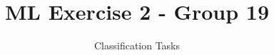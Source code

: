 \documentclass{sig-alternate-05-2015}
\begin{document}






%

\title{ML Exercise 2 - Group 19}
\subtitle{Classification Tasks}
%
%
%
%
%
\end{document}
